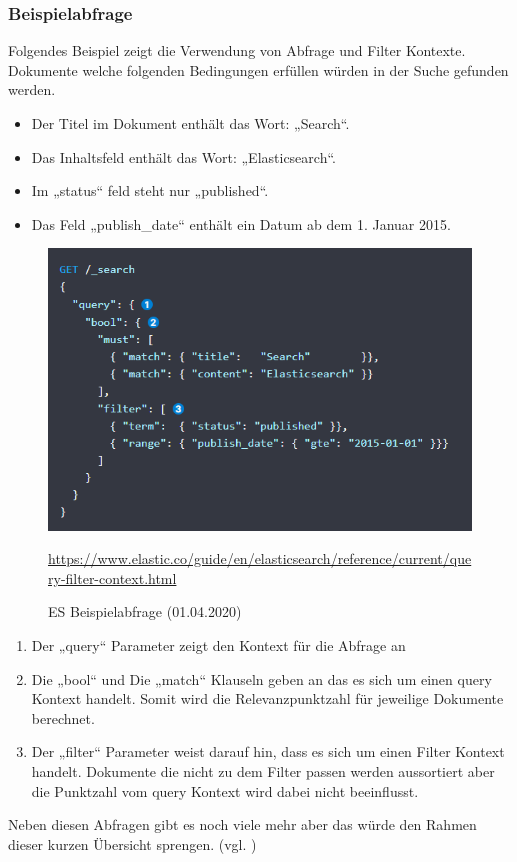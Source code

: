 \subsubsection{Beispielabfrage}
Folgendes Beispiel zeigt die Verwendung von Abfrage und Filter Kontexte. Dokumente welche folgenden Bedingungen erfüllen würden in der Suche gefunden werden.
\begin{itemize}
    \item Der Titel im Dokument enthält das Wort: „Search“.
    \item Das Inhaltsfeld enthält das Wort: „Elasticsearch“.
    \item Im „status“ feld steht nur „published“.
    \item Das Feld „publish\_date“ enthält ein Datum ab dem 1. Januar 2015.
\end{itemize}
\begin{figure}[H]
    \centering
    \includegraphics[scale=1]{images/ES_queryBsp.PNG}
    \caption{ES Beispielabfrage (01.04.2020)}
    \url{https://www.elastic.co/guide/en/elasticsearch/reference/current/query-filter-context.html}
    \label{img:ESexamplebsp}
\end{figure}
\begin{enumerate}
    \item Der „query“ Parameter zeigt den Kontext für die Abfrage an
    \item Die „bool“ und Die „match“ Klauseln geben an das es sich um einen query Kontext handelt. Somit wird die Relevanzpunktzahl für jeweilige Dokumente berechnet.
    \item Der „filter“ Parameter weist darauf hin, dass es sich um einen Filter Kontext handelt. Dokumente die nicht zu dem Filter passen werden aussortiert aber die Punktzahl vom query Kontext wird dabei nicht beeinflusst.
\end{enumerate}
Neben diesen Abfragen gibt es noch viele mehr aber das würde den Rahmen dieser kurzen Übersicht sprengen. (vgl. \cite{DSLQueryFilter})
